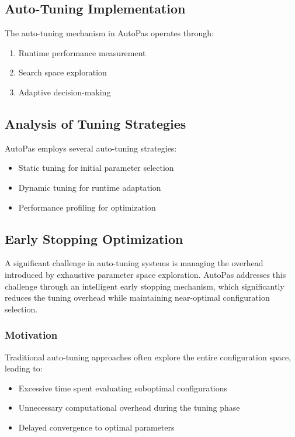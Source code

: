 \documentclass[conference]{IEEEtran}
\begin{document}
\subsection{Auto-Tuning Implementation}
The auto-tuning mechanism in AutoPas operates through:

\begin{enumerate}
    \item Runtime performance measurement
    \item Search space exploration
    \item Adaptive decision-making
\end{enumerate}

\subsection{Analysis of Tuning Strategies}

AutoPas employs several auto-tuning strategies:

\begin{itemize}
    \item Static tuning for initial parameter selection
    \item Dynamic tuning for runtime adaptation
    \item Performance profiling for optimization
\end{itemize}



\subsection{Early Stopping Optimization}
A significant challenge in auto-tuning systems is managing the overhead introduced by exhaustive parameter space exploration. AutoPas addresses this challenge through an intelligent early stopping mechanism, which significantly reduces the tuning overhead while maintaining near-optimal configuration selection.

\subsubsection{Motivation}
Traditional auto-tuning approaches often explore the entire configuration space, leading to:
\begin{itemize}
    \item Excessive time spent evaluating suboptimal configurations
    \item Unnecessary computational overhead during the tuning phase
    \item Delayed convergence to optimal parameters
\end{itemize}
\end{document}
